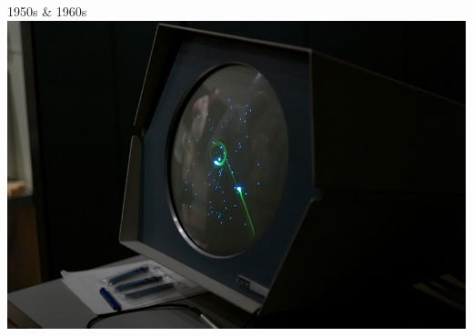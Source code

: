 \documentclass{lug}
\begin{document}
\begin{frame}{1950s \& 1960s}
{        \includegraphics[width=\textwidth]{graphics/spacewar}
    }
\end{frame}
\end{document}
